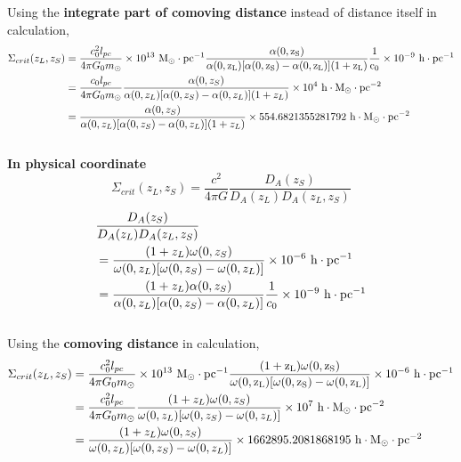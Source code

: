 \documentclass[12pt, a4paper]{article}
\begin{document}
Using the \textbf{integrate part of comoving distance} instead of distance itself in calculation,
\begin{align}
\Sigma_{crit}(z_L, z_S) &= \frac{c_0^2 l_{pc}}{4\pi G_0 m_{\odot}}\times 10^{13} \ \rm{M_{\odot} \cdot pc^{-1}} \frac{\alpha(0,z_S)}{\alpha(0,z_L)[\alpha(0,z_S) - \alpha(0,z_L)] (1+z_L)} \frac{1}{c_0} \times 10^{-9} \ \rm{h \cdot pc^{-1}} \nonumber \\
&=\frac{c_0 l_{pc}}{4\pi G_0 m_{\odot}}\frac{\alpha(0,z_S)}{\alpha(0,z_L)[\alpha(0,z_S) - \alpha(0,z_L)] (1+z_L)}\times 10^4 \ \rm{h \cdot M_{\odot}\cdot pc^{-2}} \nonumber\\
&=\frac{\alpha(0,z_S)}{\alpha(0,z_L)[\alpha(0,z_S) - \alpha(0,z_L)] (1+z_L)}\times 554.6821355281792 \ \rm{h \cdot M_{\odot} \cdot pc^{-2}}
\end{align}
\\



\noindent \textbf{In physical coordinate}
\begin{equation}
\Sigma_{crit}(z_L, z_S) = \frac{c^2}{4\pi G}\frac{D_A (z_S)}{D_A (z_L) D_A (z_L, z_S)}
\end{equation}
\begin{align}
&\frac{D_A (z_S)}{D_A (z_L) D_A (z_L, z_S)} \nonumber \\
&=\frac{(1+z_L)\omega(0,z_S)}{\omega(0,z_L)[\omega(0,z_S) - \omega(0,z_L)]}\times 10^{-6}\ \rm{h \cdot pc^{-1}} \\
&=\frac{(1+z_L)\alpha(0,z_S)}{\alpha(0,z_L)[\alpha(0,z_S) - \alpha(0,z_L)]} \frac{1}{c_0} \times 10^{-9} \ \rm{h \cdot pc^{-1}}
\end{align}
\\

Using the \textbf{comoving distance} in calculation,
\begin{align}
\Sigma_{crit}(z_L, z_S) &= \frac{c_0^2 l_{pc}}{4\pi G_0 m_{\odot}}\times 10^{13} \ \rm{M_{\odot} \cdot pc^{-1}} \frac{(1+z_L)\omega(0,z_S)}{\omega(0,z_L)[\omega(0,z_S) - \omega(0,z_L)]}\times 10^{-6}\ \rm{h \cdot pc^{-1}} \nonumber\\
&=\frac{c_0^2 l_{pc}}{4\pi G_0 m_{\odot}}\frac{(1+z_L)\omega(0,z_S)}{\omega(0,z_L)[\omega(0,z_S) - \omega(0,z_L)]}\times 10^7 \ \rm{h \cdot M_{\odot}\cdot pc^{-2}} \nonumber\\
&=\frac{(1+z_L)\omega(0,z_S)}{\omega(0,z_L)[\omega(0,z_S) - \omega(0,z_L)]}\times 1662895.2081868195 \ \rm{h \cdot M_{\odot} \cdot pc^{-2}}
\end{align}
\\
\end{document}
